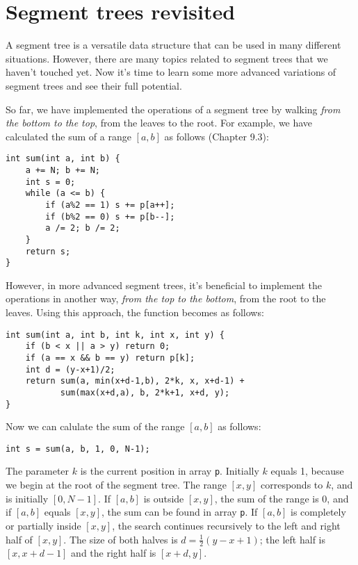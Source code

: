 \chapter{Segment trees revisited}


A segment tree is a versatile data structure
that can be used in many different situations.
However, there are many topics related to segment trees
that we haven't touched yet.
Now it's time to learn some more advanced variations
of segment trees and see their full potential.

So far, we have implemented the operations
of a segment tree by walking \emph{from the bottom to the top},
from the leaves to the root.
For example, we have calculated the sum of a range $[a,b]$
as follows (Chapter 9.3):

\begin{lstlisting}
int sum(int a, int b) {
    a += N; b += N;
    int s = 0;
    while (a <= b) {
        if (a%2 == 1) s += p[a++];
        if (b%2 == 0) s += p[b--];
        a /= 2; b /= 2;
    }
    return s;
}
\end{lstlisting}
However, in more advanced segment trees,
it's beneficial to implement the operations
in another way, \emph{from the top to the bottom},
from the root to the leaves.
Using this approach, the function becomes as follows:

\begin{lstlisting}
int sum(int a, int b, int k, int x, int y) {
    if (b < x || a > y) return 0;
    if (a == x && b == y) return p[k];
    int d = (y-x+1)/2;
    return sum(a, min(x+d-1,b), 2*k, x, x+d-1) +
           sum(max(x+d,a), b, 2*k+1, x+d, y);
}
\end{lstlisting}
Now we can calulate the sum of the range $[a,b]$
as follows:

\begin{lstlisting}
int s = sum(a, b, 1, 0, N-1);
\end{lstlisting}
The parameter $k$ is the current position
in array \texttt{p}.
Initially $k$ equals 1, because we begin
at the root of the segment tree.
The range $[x,y]$ corresponds to $k$,
and is initially $[0,N-1]$.
If $[a,b]$ is outside $[x,y]$,
the sum of the range is 0,
and if $[a,b]$ equals $[x,y]$,
the sum can be found in array \texttt{p}.
If $[a,b]$ is completely or partially inside $[x,y]$,
the search continues recursively to the
left and right half of $[x,y]$.
The size of both halves is $d=\frac{1}{2}(y-x+1)$;
the left half is $[x,x+d-1]$
and the right half is $[x+d,y]$.

